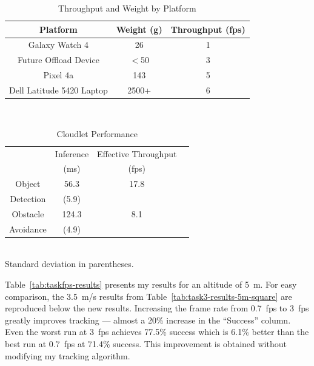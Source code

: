 \begin{table}
        \centering\small
        \begin{tabular}{|c|c|c|}
                \hline
                Platform & Weight (g) & Throughput (fps)\\
                \hline
                Galaxy Watch 4 & 26 & 1 \\
                Future Offload Device & $<$50 & 3\\
                Pixel 4a & 143 & 5 \\
                Dell Latitude 5420 Laptop & 2500+ & 6 \\
                \hline
        \end{tabular}\\
        \caption{Throughput and Weight by Platform}
        \label{tab:throughput}
\end{table}

\begin{table}
        \centering
        \begin{tabular}{|c|c|c|c|}
                \hline
                & Inference & Effective Throughput \\
                & (ms) & (fps) \\
                \hline
                Object & 56.3 & 17.8  \\
                Detection & (5.9) &  \\
                \hline
                Obstacle & 124.3 & 8.1 \\
                Avoidance & (4.9) &  \\
                \hline
        \end{tabular}
        \begin{captext}
                \centering \\[0.1cm] Standard deviation in parentheses. \\
        \end{captext}
        \caption{Cloudlet Performance}
        \label{tab:cloudlet-perf}
\end{table}

Table~\ref{tab:taskfps-results} presents my results for an altitude of
5~m.  For easy comparison, the 3.5~m/s results from
Table~\ref{tab:task3-results-5m-square} are reproduced below the new
results.  Increasing the frame rate from 0.7~fps to 3~fps greatly
improves tracking --- almost a 20\% increase in the ``Success''
column.  Even the worst run at 3~fps achieves 77.5\% success which is
6.1\% better than the best run at 0.7~fps at 71.4\%
success.  This improvement is obtained without modifying my tracking
algorithm. 

